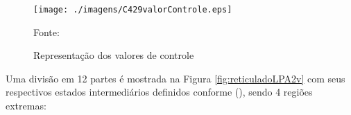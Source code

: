 \begin{figure}[!htb]
\caption{Representação dos valores de controle}
\center\texttt{[image: ./imagens/C429valorControle.eps]}
\label{fig:valorControle}

{\small Fonte: \cite{JoaoInacio}}
\end{figure}

Uma divisão em 12 partes é mostrada na Figura \ref{fig:reticuladoLPA2v} com seus respectivos estados intermediários definidos conforme \citeauthor{JoaoInacio}(\citeyear{JoaoInacio}), sendo 4 regiões extremas:




